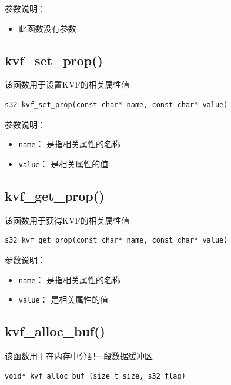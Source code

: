 		参数说明：
		\begin{itemize}
			\item \verb||
				此函数没有参数
		\end{itemize}

	\subsection{kvf\_set\_prop()}
		该函数用于设置KVF的相关属性值
		\begin{Verbatim}[frame = none]
    s32 kvf_set_prop(const char* name, const char* value)		
		\end{Verbatim}
		

		参数说明：
		\begin{itemize}
		\item \verb|name|：
			是指相关属性的名称
		\item \verb|value|：
			是相关属性的值
		\end{itemize}

	\subsection{kvf\_get\_prop()}
		该函数用于获得KVF的相关属性值
		\begin{Verbatim}[frame = none]
    s32 kvf_get_prop(const char* name, const char* value)		
		\end{Verbatim}
		

		参数说明：
		\begin{itemize}
		\item \verb|name|：
			是指相关属性的名称
		\item \verb|value|：
			是相关属性的值
		\end{itemize}
	
	\subsection{kvf\_alloc\_buf()}
		该函数用于在内存中分配一段数据缓冲区
		\begin{Verbatim}[frame = none]
    void* kvf_alloc_buf (size_t size, s32 flag)		
		\end{Verbatim}
		
